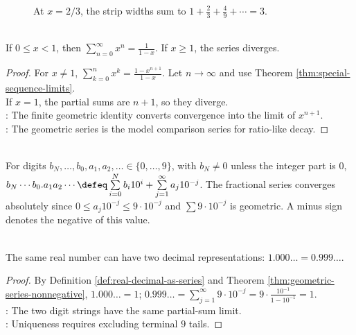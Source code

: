 \begin{figure}[H]
  \centering
  
  \caption{At $x=2/3$, the strip widths sum to $1+\frac23+\frac49+\cdots=3$.}
  \label{fig:geometric-series-rectangle-two-thirds}
\end{figure}

\begin{theorem} \label{thm:geometric-series-nonnegative} \\
If $0\leq x<1$, then $\sum\limits_{n=0}^{\infty}x^n=\frac{1}{1-x}$. If $x\geq1$, the series diverges.
\begin{proof}
For $x\neq1$, $\sum\limits_{k=0}^{n}x^k=\frac{1-x^{n+1}}{1-x}$. Let $n\to\infty$ and use Theorem \ref{thm:special-sequence-limits}.\\
If $x=1$, the partial sums are $n+1$, so they diverge.\\
: The finite geometric identity converts convergence into the limit of $x^{n+1}$.\\
: The geometric series is the model comparison series for ratio-like decay.
\end{proof}
\end{theorem}

\begin{definition} \label{def:real-decimal-as-series} \\
For digits $b_N,\ldots,b_0,a_1,a_2,\ldots\in\{0,\ldots,9\}$, with $b_N\neq0$ unless the integer part is $0$,\\
$b_N\cdots b_0.a_1a_2\cdots \defeq \sum\limits_{i=0}^{N}b_i10^i+\sum\limits_{j=1}^{\infty}a_j10^{-j}$. The fractional series converges absolutely since $0\leq a_j10^{-j}\leq9\cdot10^{-j}$ and $\sum 9\cdot10^{-j}$ is geometric. A minus sign denotes the negative of this value.
\end{definition}

\begin{proposition} \label{prop:decimal-terminal-nine-nonuniqueness} \\
The same real number can have two decimal representations: $1.000\ldots=0.999\ldots$.
\begin{proof}
By Definition \ref{def:real-decimal-as-series} and Theorem \ref{thm:geometric-series-nonnegative}, $1.000\ldots=1$; $0.999\ldots=\sum\limits_{j=1}^{\infty}9\cdot10^{-j} =9\cdot\frac{10^{-1}}{1-10^{-1}}=1$.\\
: The two digit strings have the same partial-sum limit.\\
: Uniqueness requires excluding terminal $9$ tails.
\end{proof}
\end{proposition}

